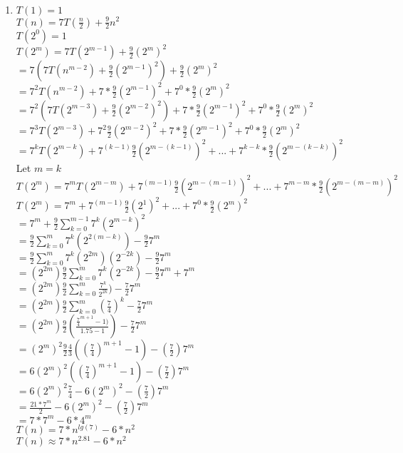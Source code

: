 \documentclass[12pt]{article}%
\begin{document}
\begin{enumerate}[label=(\alph*)]
\item

$T(1) = 1$\\
$T(n) = 7T(\frac{n}{2}) + \frac{9}{2}n^2$\\
$T(2^0) = 1$\\
$T(2^m) = 7T(2^{m-1}) + \frac{9}{2}(2^m)^2$\\
$= 7(7T(n^{m-2}) + \frac{9}{2}(2^{m-1})^2) + \frac{9}{2}(2^m)^2$\\
$= 7^2T(n^{m-2}) + 7*\frac{9}{2}(2^{m-1})^2 + 7^0*\frac{9}{2}(2^m)^2$\\
$= 7^2(7T(2^{m-3}) + \frac{9}{2}(2^{m-2})^2) + 7*\frac{9}{2}(2^{m-1})^2 + 7^0*\frac{9}{2}(2^m)^2$\\
$= 7^3T(2^{m-3}) + 7^2\frac{9}{2}(2^{m-2})^2 + 7*\frac{9}{2}(2^{m-1})^2 + 7^0*\frac{9}{2}(2^m)^2$\\
$= 7^kT(2^{m-k}) + 7^{(k-1)}\frac{9}{2}(2^{m-(k-1)})^2 + ... + 7^{k-k}*\frac{9}{2}(2^{m-(k-k)})^2$\\

Let $m = k$\\
$T(2^m)= 7^mT(2^{m-m}) + 7^{(m-1)}\frac{9}{2}(2^{m-(m-1)})^2 + ... + 7^{m-m}*\frac{9}{2}(2^{m-(m-m)})^2$\\
$T(2^m)= 7^m + 7^{(m-1)}\frac{9}{2}(2^{1})^2 + ... + 7^{0}*\frac{9}{2}(2^{m})^2$\\
$= 7^m + \frac{9}{2}\sum_{k=0}^{m-1}7^k(2^{m-k})^2$\\
$= \frac{9}{2}\sum_{k=0}^{m}7^k(2^{2(m-k)}) - \frac{9}{2}7^m$\\
$= \frac{9}{2}\sum_{k=0}^{m}7^k(2^{2m})(2^{-2k}) - \frac{9}{2}7^m$\\
$= (2^{2m})\frac{9}{2}\sum_{k=0}^{m}7^k(2^{-2k}) - \frac{9}{2}7^m + 7^m$\\
$= (2^{2m})\frac{9}{2}\sum_{k=0}^{m}\frac{7^k}{2^{2k}}) - \frac{7}{2}7^m$\\
$= (2^{2m})\frac{9}{2}\sum_{k=0}^{m}(\frac{7}{4})^k - \frac{7}{2}7^m$\\
$= (2^{2m})\frac{9}{2}(\frac{\frac{7}{4}^{m+1} -1)}{1.75-1}) - \frac{7}{2}7^m$\\
$= (2^m)^2\frac{9}{2}\frac{4}{3}((\frac{7}{4})^{m+1}-1) - (\frac{7}{2})7^m$\\
$= 6(2^m)^2((\frac{7}{4})^{m+1}-1) - (\frac{7}{2})7^m$\\
$= 6(2^m)^2\frac{7}{4} - 6(2^m)^2 - (\frac{7}{2})7^m$\\
$= \frac{21*7^m}{2} - 6(2^m)^2 - (\frac{7}{2})7^m$\\
$= 7*7^m - 6 * 4^m$\\
$T(n)= 7*n^{lg(7)} - 6 * n^2$\\
$T(n) \approx 7*n^{2.81} - 6 * n^2$\\


\end{enumerate}
\end{document}
